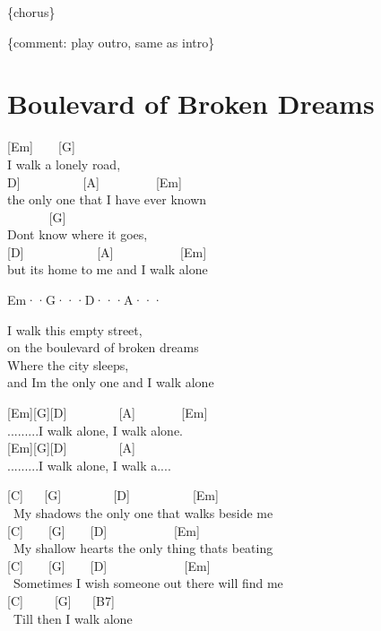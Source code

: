 \documentclass[
  letterpaper,
  twoside=false]{scrbook}
\begin{document}
\{chorus\}

\{comment: play outro, same as intro\}

\hypertarget{boulevard-of-broken-dreams}{%
\chapter{Boulevard of Broken Dreams}\label{boulevard-of-broken-dreams}}

{[}Em{]} ~ ~ {[}G{]} ~ ~ ~ ~ ~\\
I walk a lonely road,\\
\hspace*{0.333em}{[}D{]} ~ ~ ~ ~ ~ ~{[}A{]} ~ ~ ~ ~ ~ {[}Em{]}\\
the only one that I have ever known\\
\hspace*{0.333em} ~ ~ ~ ~ {[}G{]} ~ ~ ~ ~ ~\\
Don\textquotesingle t know where it goes,\\
{[}D{]} ~ ~ ~ ~ ~ ~ ~{[}A{]} ~ ~ ~ ~ ~ ~ {[}Em{]}\\
but it\textquotesingle s home to me and I walk alone

Em··\textbar G···\textbar D···\textbar A···\textbar{}

I walk this empty street,\\
on the boulevard of broken dreams\\
Where the city sleeps,\\
and I\textquotesingle m the only one and I walk alone

{[}Em{]}{[}G{]}{[}D{]} ~ ~ ~ ~ ~{[}A{]} ~ ~ ~ ~ {[}Em{]}\\
.........I walk alone, I walk alone.\\
{[}Em{]}{[}G{]}{[}D{]} ~ ~ ~ ~ ~{[}A{]}\\
.........I walk alone, I walk a....

{[}C{]} ~ ~{[}G{]} ~ ~ ~ ~ ~{[}D{]} ~ ~ ~ ~ ~ ~{[}Em{]}\\
\hspace*{0.333em} ~My shadow\textquotesingle s the only one that walks
beside me\\
{[}C{]} ~ ~ {[}G{]} ~ ~ {[}D{]} ~ ~ ~ ~ ~ ~ {[}Em{]}\\
\hspace*{0.333em} ~My shallow heart\textquotesingle s the only thing
that\textquotesingle s beating\\
{[}C{]} ~ ~ {[}G{]} ~ ~ {[}D{]} ~ ~ ~ ~ ~ ~ ~ {[}Em{]}\\
\hspace*{0.333em} ~Sometimes I wish someone out there will find me\\
{[}C{]} ~ ~ ~{[}G{]} ~ ~{[}B7{]}\\
\hspace*{0.333em} ~Till then I walk alone
\end{document}
